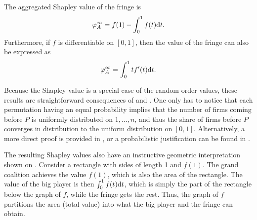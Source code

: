 \begin{corollary}
    \label{cor:fringe_value}
    The aggregated Shapley value of the fringe is
    \begin{align*}
        \varphi_A^\infty = f(1) - \int_0^1 f(t) \mathrm{d}t.
    \end{align*}
    Furthermore, if $f$ is differentiable on $[0, 1]$, then the value of the fringe can also be expressed as
    \begin{align*}
        \varphi_A^\infty = \int_0^1 t f'(t) \mathrm{d}t.
    \end{align*}
\end{corollary}

Because the Shapley value is a special case of the random order values, these results are straightforward consequences of  and .
One only has to notice that each permutation having an equal probability implies that the number of firms coming before $P$ is uniformly distributed on $1, \dots, n$, and thus the share of firms before $P$ converges in distribution to the uniform distribution on $[0, 1]$.
Alternatively, a more direct proof is provided in , or a probabilistic justification can be found in \textcite{levy1997individual}.

The resulting Shapley values also have an instructive geometric interpretation shown on .
Consider a rectangle with sides of length 1 and $f(1)$.
The grand coalition achieves the value $f(1)$, which is also the area of the rectangle.
The value of the big player is then $\int_0^1 f(t) \mathrm{d}t$, which is simply the part of the rectangle below the graph of $f$, while the fringe gets the rest.
Thus, the graph of $f$ partitions the area (total value) into what the big player and the fringe can obtain.

